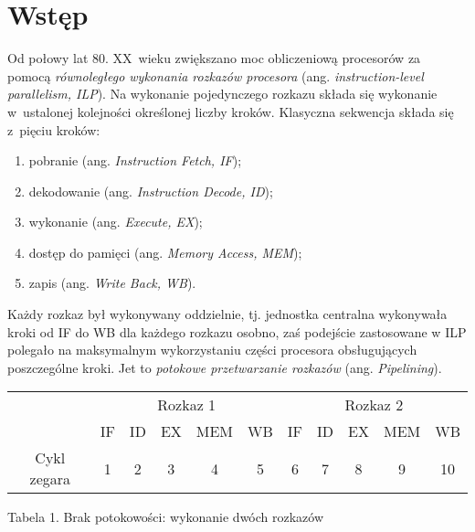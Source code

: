 \section{Wstęp}
%
\indent 
	Od połowy lat 80. XX~wieku zwiększano moc obliczeniową procesorów za pomocą \emph{równoległego wykonania rozkazów procesora}
	(ang. \emph{instruction-level parallelism, ILP}). Na wykonanie pojedynczego rozkazu składa się wykonanie w~ustalonej kolejności
	określonej liczby kroków. Klasyczna sekwencja składa się z~pięciu kroków:
	\begin{enumerate}
	\item pobranie (ang. \emph{Instruction Fetch, IF});
	\item dekodowanie (ang. \emph{Instruction Decode, ID});
	\item wykonanie (ang. \emph{Execute, EX});
	\item dostęp do pamięci (ang. \emph{Memory Access, MEM});
	\item zapis (ang. \emph{Write Back, WB}).
	\end{enumerate}
	Każdy rozkaz był wykonywany oddzielnie, tj. jednostka centralna wykonywała kroki od IF do WB dla każdego rozkazu osobno, zaś
	podejście zastosowane w ILP polegało na maksymalnym wykorzystaniu części procesora obsługujących poszczególne kroki.
	Jet to \emph{potokowe przetwarzanie rozkazów} (ang. \emph{Pipelining}).
	\begin{center}
	\begin{tabular}{|c|c|c|c|c|c|c|c|c|c|c|} \hline
	& \multicolumn{5}{c|}{Rozkaz 1} & \multicolumn{5}{c|}{Rozkaz 2}  \\ \cline{2-11}
	& IF & ID & \cellcolor{yellow} EX & MEM & WB & IF & ID & EX & MEM & WB\\ \cline{2-11} \cline{2-11}
	Cykl zegara & 1 & 2 & \cellcolor{yellow} 3 & 4 & 5 & 6 & 7 & 8 & 9 & 10 \\ \hline
	\end{tabular}\par
	\begin{small} Tabela 1. Brak potokowości: wykonanie dwóch rozkazów \end{small} \par
	\end{center}\par

